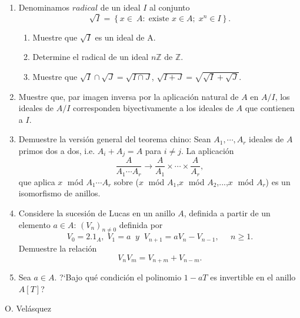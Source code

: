 \documentclass[12pt]{report}
\begin{document}
\begin{enumerate}
\item Denominamos $radical$ de un ideal $I$ al conjunto $$\sqrt I=\left\lbrace x\in\ A:\;\text{existe }x\in A;\; x^n\in I\right\rbrace.$$ 
\begin{enumerate}
\item Muestre que $\sqrt I $ es un ideal de A.
\item Determine el radical de un ideal $n\mathbb{Z} \text{ de } \mathbb{Z}.$
\item Muestre que $\sqrt I\cap\sqrt J=\sqrt{I\cap J}$, $\sqrt{I+J}=\sqrt{\sqrt I+\sqrt J}.$
\end{enumerate}
\item Muestre que, par imagen inversa por la aplicaci\'on natural de $A$ en $A/I$, los ideales de $A/I$ corresponden biyectivamente a los ideales de $A$ que contienen a $I$.
\item Demuestre la versi\'on general del teorema chino: Sean $A_1, \cdots,A_r$ ideales de $A$ primos dos a dos, i.e. $A_i+A_j=A$ para $i\neq j$. La aplicaci\'on $$\frac{A}{A_1\cdots A_r}\rightarrow\frac{A}{A_1}\times\cdots\times\frac{A}{A_r},$$ que aplica $x\;$ m\'od $A_1\cdots A_r$ sobre ($x\;$  m\'od $A_1$,$x\;$ m\'od $A_2$,...,$x\;$ m\'od $A_r$) es un isomorfismo de anillos.
\item Considere la sucesi\'on de Lucas en un anillo $A$, definida a partir de un elemento $a\in A$:  $(V_n)_{n\neq 0}$ definida por $$V_0=2.1_A,\; V_1=a \;\;y\;\; V_{n+1}=aV_n-V_{n-1}, \;\;\;\;\;n\geq 1.$$ Demuestre la relaci\'on $$V_nV_m=V_{n+m}+V_{n-m}.$$
\item Sea $a\in A.$ ?`Bajo qu\'e condici\'on el polinomio $1-aT$ es invertible en el anillo $A[T]$?
\end{enumerate}
\begin{flushright}
O. Vel\'asquez
\end{flushright}
\end{document}
